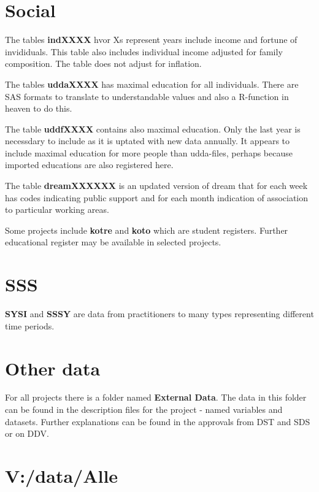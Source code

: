 \documentclass[
]{article}
\begin{document}
\hypertarget{social}{%
\section{Social}\label{social}}

The tables \textbf{indXXXX} hvor Xs represent years include income and
fortune of invididuals. This table also includes individual income
adjusted for family composition. The table does not adjust for
inflation.

The tables \textbf{uddaXXXX} has maximal education for all individuals.
There are SAS formats to translate to understandable values and also a
R-function in heaven to do this.

The table \textbf{uddfXXXX} contains also maximal education. Only the
last year is necessdary to include as it is uptated with new data
annually. It appears to include maximal education for more people than
udda-files, perhaps because imported educations are also registered
here.

The table \textbf{dreamXXXXXX} is an updated version of dream that for
each week has codes indicating public support and for each month
indication of association to particular working areas.

Some projects include \textbf{kotre} and \textbf{koto} which are student
registers. Further educational register may be available in selected
projects.

\hypertarget{sss}{%
\section{SSS}\label{sss}}

\textbf{SYSI} and \textbf{SSSY} are data from practitioners to many
types representing different time periods.

\hypertarget{other-data}{%
\section{Other data}\label{other-data}}

For all projects there is a folder named \textbf{External Data}. The
data in this folder can be found in the description files for the
project - named variables and datasets. Further explanations can be
found in the approvals from DST and SDS or on DDV.

\hypertarget{vdataalle}{%
\section{V:/data/Alle}\label{vdataalle}}
\end{document}
